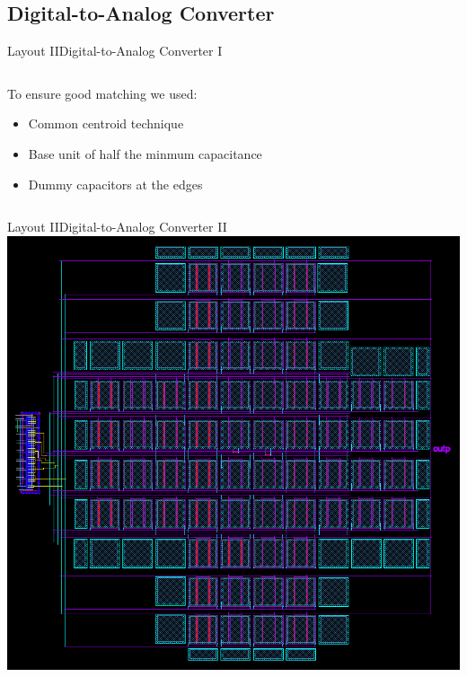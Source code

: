 \documentclass{beamer}
\begin{document}
 \subsection{Digital-to-Analog Converter}
 \begin{frame}{Layout II}{Digital-to-Analog Converter I}
    \begin{columns}
    \begin{column}{0.40\linewidth}
    To ensure good matching we used: 
    \begin{itemize}
        \item Common centroid technique
        \item<2-> Base unit of half the minmum capacitance
        \item<3-> Dummy capacitors at the edges
    \end{itemize}
    \vspace{3em}
    \end{column}
    \begin{column}{0.60\linewidth}
        \centering
        
    \end{column}
    \end{columns}
 \end{frame}
 
 \begin{frame}{Layout II}{Digital-to-Analog Converter II}
     \centering
     \includegraphics[height=.8\textheight]{img/cap_layout}
 \end{frame}
 
\end{document}
